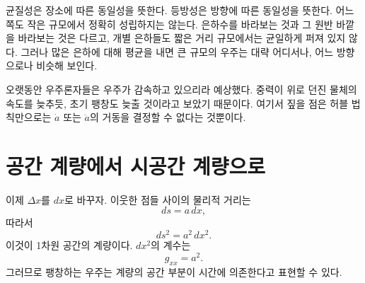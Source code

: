균질성은 장소에 따른 동일성을 뜻한다. 등방성은 방향에 따른 동일성을 뜻한다. 어느 쪽도 작은 규모에서 정확히 성립하지는 않는다. 은하수를 바라보는 것과 그 원반 바깥을 바라보는 것은 다르고, 개별 은하들도 짧은 거리 규모에서는 균일하게 퍼져 있지 않다. 그러나 많은 은하에 대해 평균을 내면 큰 규모의 우주는 대략 어디서나, 어느 방향으로나 비슷해 보인다.

\begin{classroomqa}\end{classroomqa}

오랫동안 우주론자들은 우주가 감속하고 있으리라 예상했다. 중력이 위로 던진 물체의 속도를 늦추듯, 초기 팽창도 늦출 것이라고 보았기 때문이다. 여기서 짚을 점은 허블 법칙만으로는 \(\dot a\) 또는 \(\ddot a\)의 거동을 결정할 수 없다는 것뿐이다.

\begin{classroomqa}\end{classroomqa}

\section{공간 계량에서 시공간 계량으로}

이제 \(\Delta x\)를 \(dx\)로 바꾸자. 이웃한 점들 사이의 물리적 거리는
\begin{equation}
ds=a\,dx,
\end{equation}
따라서
\begin{equation}
ds^2=a^2\,dx^2.
\end{equation}
이것이 1차원 공간의 계량이다. \(dx^2\)의 계수는
\begin{equation}
g_{xx}=a^2.
\end{equation}
그러므로 팽창하는 우주는 계량의 공간 부분이 시간에 의존한다고 표현할 수 있다.

